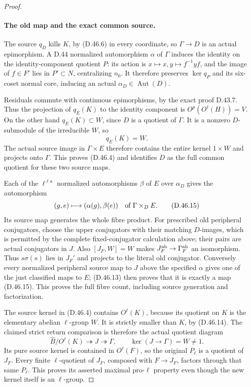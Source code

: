 \begin{proof}
\paragraph{The old map and the exact common source.}
The source \(q_D\) kills \(K\), by
\textup{(D.46.6)} in every coordinate, so \(\Gamma\to D\)
is an actual epimorphism. A D.44 normalized automorphism
\(\alpha\) of \(\Gamma\) induces the identity on
the identity-component quotient \(P\): its action is
\(x\mapsto x,y\mapsto f^{-1}yf\), and the image of
\(f\in F'\) lies in \(P'\subset N\), centralizing
\(n_0\). It therefore preserves \(\ker q_P\) and
its six-coset normal core, inducing an actual
\(\alpha_D\in\operatorname{Aut}(D)\).

Residuals commute with continuous epimorphisms, by the
exact proof D.43.7. Thus the projection of \(q_E(K)\)
to the identity component is
\(O^p(O^\ell(H))=V\).
On the other hand \(q_E(K)\subset W\), since
\(D\) is a quotient of \(\Gamma\).
It is a nonzero \(D\)-submodule of the irreducible
\(W\), so
\[
                         q_E(K)=W.
 \tag{D.46.14}
\]
The actual source image in \(\Gamma\times E\)
therefore contains the entire kernel \(1\times W\)
and projects onto \(\Gamma\). This proves
\textup{(D.46.4)} and identifies \(D\) as the full
common quotient for these two source maps.

Each of the \(\ell^{\ell a}\) normalized
automorphisms \(\beta\) of \(E\) over
\(\alpha_D\) gives the automorphism
\[
               (g,e)\longmapsto(\alpha(g),\beta(e))
                   \quad\hbox{of }\Gamma\times_D E.
 \tag{D.46.15}
\]
Its source map generates the whole fibre product.
For prescribed old peripheral conjugators, choose the
upper conjugators with their matching \(D\)-images,
which is permitted by the complete fixed-conjugator
calculation above; their pairs are actual conjugators
in \(J\). Also \([J_F,W]=W\) makes
\(J_F^{\rm ab}\to\Gamma_F^{\rm ab}\) an isomorphism.
Thus \(s\sigma(s)\) lies in \(J_F'\) and projects
to the literal old conjugator. Conversely every
normalized peripheral source map to \(J\) above
the specified \(\alpha\) gives one of the just
classified maps to \(E\); \textup{(D.46.13)}
then proves that it is exactly a map
\textup{(D.46.15)}. This proves the full fibre count,
including source generation and factorization.

The source kernel in \textup{(D.46.4)} contains
\(O^\ell(K)\), because its quotient on \(K\)
is the elementary abelian \(\ell\)-group \(W\).
It is strictly smaller than \(K\), by
\textup{(D.46.14)}. The claimed strict return comparison
is therefore the actual quotient diagram
\[
 \widehat B/O^\ell(K)\twoheadrightarrow J
       \twoheadrightarrow\Gamma,
 \qquad \ker(J\to\Gamma)=W\ne1.
 \tag{D.46.16}
\]
Its pure source kernel is contained in \(O^\ell(F)\),
so the original \(P_\ell\) is a quotient of \(J_F\).
Every finite \(\ell\)-quotient of \(J_F\), composed
with \(F\to J_F\), factors through that same
\(P_\ell\). This proves its asserted maximal
pro-\(\ell\) property even though the new kernel
itself is an \(\ell\)-group.


\end{proof}
